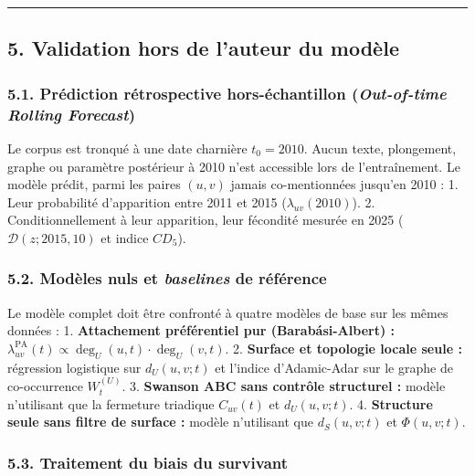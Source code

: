 \documentclass[a4paper,11pt]{article}
\begin{document}
\begin{center}\rule{0.5\linewidth}{0.5pt}\end{center}

\subsection*{5. Validation hors de l'auteur du modèle}

\subsubsection*{\texorpdfstring{5.1. Prédiction rétrospective
hors-échantillon (\emph{Out-of-time Rolling
Forecast})}{5.1. Prédiction rétrospective hors-échantillon (Out-of-time Rolling Forecast)}}

Le corpus est tronqué à une date charnière \(t_0 = 2010\). Aucun texte,
plongement, graphe ou paramètre postérieur à 2010 n'est accessible lors
de l'entraînement. Le modèle prédit, parmi les paires \((u,v)\) jamais
co-mentionnées jusqu'en 2010 : 1. Leur probabilité d'apparition entre
2011 et 2015 (\(\lambda_{uv}(2010)\)). 2. Conditionnellement à leur
apparition, leur fécondité mesurée en 2025 (\(\mathcal{D}(z; 2015, 10)\)
et indice \(CD_5\)).

\subsubsection*{\texorpdfstring{5.2. Modèles nuls et \emph{baselines} de
référence}{5.2. Modèles nuls et baselines de référence}}

Le modèle complet doit être confronté à quatre modèles de base sur les
mêmes données : 1. \textbf{Attachement préférentiel pur
(Barabási-Albert) :}
\(\lambda_{uv}^{\text{PA}}(t) \propto \deg_U(u,t) \cdot \deg_U(v,t)\).
2. \textbf{Surface et topologie locale seule :} régression logistique
sur \(d_U(u,v;t)\) et l'indice d'Adamic-Adar sur le graphe de
co-occurrence \(W^{(U)}_t\). 3. \textbf{Swanson ABC sans contrôle
structurel :} modèle n'utilisant que la fermeture triadique
\(C_{uv}(t)\) et \(d_U(u,v;t)\). 4. \textbf{Structure seule sans filtre
de surface :} modèle n'utilisant que \(d_S(u,v;t)\) et \(\Phi(u,v;t)\).

\subsubsection*{5.3. Traitement du biais du survivant}
\end{document}
